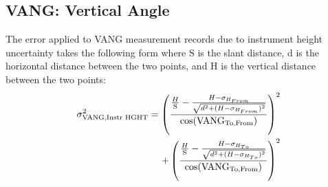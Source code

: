 \subsection{VANG: Vertical Angle}
The error applied to VANG measurement records due to instrument height uncertainty takes the following form where $\text{S}$ is the slant distance, $\text{d}$ is the horizontal distance between the two points, and $\text{H}$ is the vertical distance between the two points:
\begin{eqnarray}\label{eq:varianceVANG}
\sigma_{\text{VANG,Instr HGHT}}^2=\left(\frac{\frac{H}{\text{S}} - \frac{H-\sigma_{H_{From}}}{\sqrt{d^2 + (H-\sigma_{H_{From}})^2}}}{\cos(\text{VANG}_{\text{To,From}})}\right)^2&\\\nonumber
+\left(\frac{\frac{H}{\text{S}} - \frac{H-\sigma_{H_{To}}}{\sqrt{d^2 + (H-\sigma_{H_{To}})^2}}}{\cos(\text{VANG}_{\text{To,From}})}\right)^2
\end{eqnarray}

